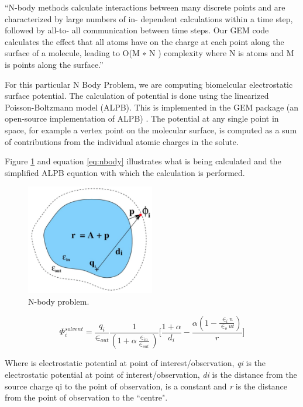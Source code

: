 \par{``N-body methods calculate interactions between many discrete points and are characterized 
    by large numbers of in- dependent calculations within a time step, followed by all-to- all 
    communication between time steps. Our GEM code calculates the effect that all atoms have on 
    the charge at each point along the surface of a molecule, leading to O(M ∗ N ) 
    complexity where N is atoms and M is points along the surface.”\cite{dwarfs}}

\par{For this particular N Body Problem, we are computing biomelcular electrostatic 
    surface potential. The calculation of potential is done using the linearized 
    Poisson-Boltzmann model (ALPB). This is implemented in the GEM package 
    (an open-source implementation of ALPB) . The potential at any single point in space, 
    for example a vertex point on the molecular surface, is computed as a sum of contributions 
    from the individual atomic charges in the solute.}

\par{Figure \ref{nbody} and equation \ref{eq:nbody} illustrates what is being calculated and the simplified ALPB equation 
    with which the calculation is performed.}

\begin{figure}[!h]
    \centering
    \includegraphics[width=0.5\textwidth]{figures/nbody.png}
    \caption{N-body problem.}
    \label{nbody}
\end{figure}

\begin{equation} \label{eq:nbody}
    \Phi_i^{solvent} = \frac{q_i}{\in_{out}}\frac{1}{(1+\alpha\frac{\in_{in}}{\in_{out}})}\Bigg[\frac{1+\alpha}{d_i}-\frac{\alpha(1-\frac{\in_in}{\in_out})}{r}\Bigg]
\end{equation}

\par{Where \Phi is electrostatic potential at point of interest/observation, \emph{qi} is the 
    electrostatic potential at point of interest/observation, \emph{di} is the distance from 
    the source charge qi to the point of observation, \alpha is a constant and \emph{r} is the 
    distance from the point of observation to the ``centre".}

